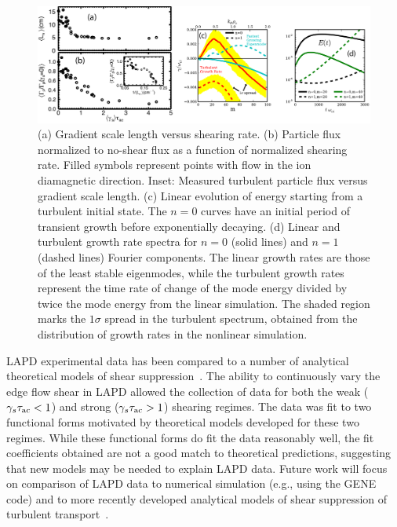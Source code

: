 \documentclass[11pt]{article}
\renewcommand{\cite}{\citep}
\begin{document}
\begin{figure}[!htbp]
\centerline{
\includegraphics[width=6.2truein]{rotation}}
\caption{\label{rotation} (a) Gradient scale length versus shearing
  rate. (b) Particle flux normalized to no-shear
  flux as a function of normalized shearing rate. Filled symbols
  represent points with flow in the ion diamagnetic direction. Inset: Measured turbulent particle flux versus
  gradient scale length. (c) Linear evolution of energy starting from a turbulent initial state. The $n = 0$ curves have an initial period
of transient growth before exponentially decaying. (d) Linear and turbulent growth rate spectra for $n = 0$ (solid lines)
and $n = 1$ (dashed lines) Fourier components. The linear
growth rates are those of the least stable eigenmodes, while
the turbulent growth rates represent the time rate of change of the
mode energy divided by twice the mode energy from the 
linear simulation. The shaded region marks the $1\sigma$ spread in the
turbulent spectrum, obtained from the distribution of growth rates in
the nonlinear simulation.
}
\end{figure}


LAPD experimental data has been compared to a number of analytical theoretical models of shear
suppression~\cite{schaffner:2013}.   The ability to continuously vary
the edge flow shear in LAPD allowed the collection of data for both
the weak ($\gamma_s \tau_{\rm ac} < 1$) and strong ($\gamma_s
\tau_{\rm ac} > 1$) shearing regimes.  The data was fit to two
functional forms motivated by theoretical models developed for these
two regimes.  While these functional forms do fit the data reasonably
well, the fit coefficients obtained are not a good match to
theoretical predictions, suggesting that new models may be needed to
explain LAPD data.  Future work will focus on comparison of LAPD data
to numerical simulation (e.g., using the GENE code) and to more
recently developed analytical models of shear suppression of turbulent
transport~\cite{staebler:2013}.
\end{document}
